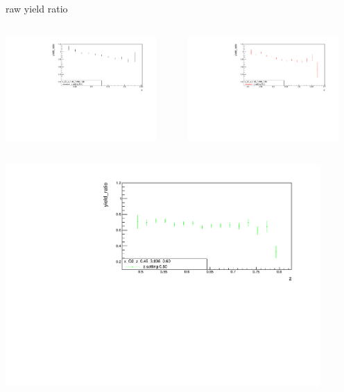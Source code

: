 \begin{frame}{raw yield ratio}
\begin{columns}
\begin{column}[T]{0.5\textwidth}
\includegraphics[width = 0.9\textwidth]{results/yield/statistics/x_Q2_z_0.45_3.898_0.40_ratio.pdf}
\end{column}
\begin{column}[T]{0.5\textwidth}
\includegraphics[width = 0.9\textwidth]{results/yield/statistics/x_Q2_z_0.45_3.898_0.50_ratio.pdf}
\end{column}
\end{columns}
\begin{columns}
\begin{column}[T]{0.5\textwidth}
\includegraphics[width = 0.9\textwidth]{results/yield/statistics/x_Q2_z_0.45_3.898_0.60_ratio.pdf}

\end{column}
\end{columns}
\end{frame}
